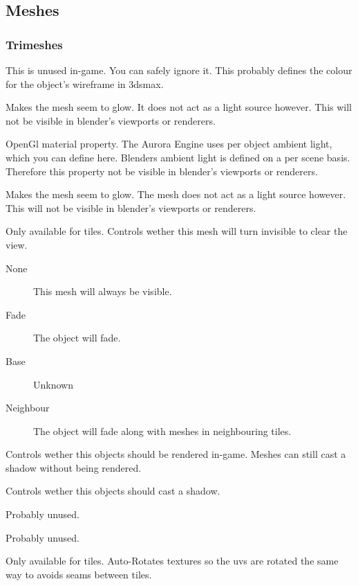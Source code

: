\subsection{Meshes}

\subsubsection{Trimeshes}

This is unused in-game. You can safely ignore it. This probably defines the
colour for the object's wireframe in 3dsmax.

Makes the mesh seem to glow. It does not act as a light source however.
This will not be visible in blender's viewports or renderers.

OpenGl material property. The Aurora Engine uses per object ambient light,
which you can define here. Blenders ambient light is defined on a per scene
basis. Therefore this property not be visible in blender's viewports or
renderers.

Makes the mesh seem to glow. The mesh does not act as a light source however.
This will not be visible in blender's viewports or renderers.

Only available for tiles. Controls wether this mesh will turn invisible to
clear the view.
\begin{description}
    \item[None] This mesh will always be visible.
    \item[Fade] The object will fade.
    \item[Base] Unknown
    \item[Neighbour] The object will fade along with meshes in neighbouring tiles.
\end{description}

Controls wether this objects should be rendered in-game. Meshes can still
cast a shadow without being rendered.

Controls wether this objects should cast a shadow.

Probably unused.

Probably unused.

Only available for tiles. Auto-Rotates textures so the uvs are rotated
the same way to avoids seams between tiles.

